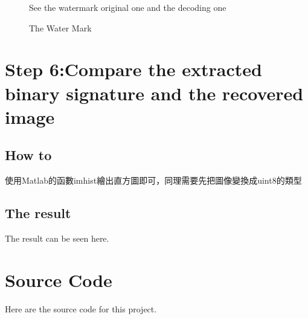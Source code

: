 \documentclass[a4paper,12pt]{article}%
\begin{document}
\begin{figure}[h]
  \centering
  \hspace{0.5in}
    \hspace{0.5in}
  \caption{See the watermark original one and the decoding one}  \label{fig:subfig} %
\end{figure}

\begin{figure}
\centering
  \caption{The Water Mark}\label{fig:watermark}
\end{figure}


\section{Step 6:Compare the extracted binary signature and the recovered image}
    \subsection{How to}
	使用Matlab的函數imhist繪出直方圖即可，同理需要先把圖像變換成uint8的類型
    \subsection{The result}
	The result can be seen here.

\section{Source Code}

Here are the source code for this project.\\
\end{document}
